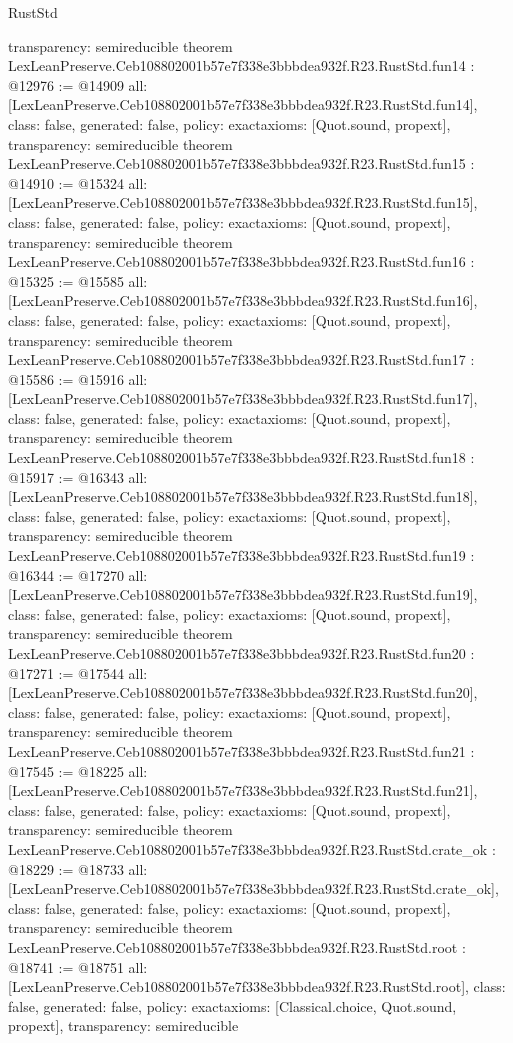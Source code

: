 \begin{lexlean}{RustStd}
\begin{coremodule}
{  transparency: semireducible
}
theorem LexLeanPreserve.Ceb108802001b57e7f338e3bbbdea932f.R23.RustStd.fun14 : @12976 := @14909 {
  all: [LexLeanPreserve.Ceb108802001b57e7f338e3bbbdea932f.R23.RustStd.fun14],
  class: false,
  generated: false,
  policy: exact{axioms: [Quot.sound, propext]},
  transparency: semireducible
}
theorem LexLeanPreserve.Ceb108802001b57e7f338e3bbbdea932f.R23.RustStd.fun15 : @14910 := @15324 {
  all: [LexLeanPreserve.Ceb108802001b57e7f338e3bbbdea932f.R23.RustStd.fun15],
  class: false,
  generated: false,
  policy: exact{axioms: [Quot.sound, propext]},
  transparency: semireducible
}
theorem LexLeanPreserve.Ceb108802001b57e7f338e3bbbdea932f.R23.RustStd.fun16 : @15325 := @15585 {
  all: [LexLeanPreserve.Ceb108802001b57e7f338e3bbbdea932f.R23.RustStd.fun16],
  class: false,
  generated: false,
  policy: exact{axioms: [Quot.sound, propext]},
  transparency: semireducible
}
theorem LexLeanPreserve.Ceb108802001b57e7f338e3bbbdea932f.R23.RustStd.fun17 : @15586 := @15916 {
  all: [LexLeanPreserve.Ceb108802001b57e7f338e3bbbdea932f.R23.RustStd.fun17],
  class: false,
  generated: false,
  policy: exact{axioms: [Quot.sound, propext]},
  transparency: semireducible
}
theorem LexLeanPreserve.Ceb108802001b57e7f338e3bbbdea932f.R23.RustStd.fun18 : @15917 := @16343 {
  all: [LexLeanPreserve.Ceb108802001b57e7f338e3bbbdea932f.R23.RustStd.fun18],
  class: false,
  generated: false,
  policy: exact{axioms: [Quot.sound, propext]},
  transparency: semireducible
}
theorem LexLeanPreserve.Ceb108802001b57e7f338e3bbbdea932f.R23.RustStd.fun19 : @16344 := @17270 {
  all: [LexLeanPreserve.Ceb108802001b57e7f338e3bbbdea932f.R23.RustStd.fun19],
  class: false,
  generated: false,
  policy: exact{axioms: [Quot.sound, propext]},
  transparency: semireducible
}
theorem LexLeanPreserve.Ceb108802001b57e7f338e3bbbdea932f.R23.RustStd.fun20 : @17271 := @17544 {
  all: [LexLeanPreserve.Ceb108802001b57e7f338e3bbbdea932f.R23.RustStd.fun20],
  class: false,
  generated: false,
  policy: exact{axioms: [Quot.sound, propext]},
  transparency: semireducible
}
theorem LexLeanPreserve.Ceb108802001b57e7f338e3bbbdea932f.R23.RustStd.fun21 : @17545 := @18225 {
  all: [LexLeanPreserve.Ceb108802001b57e7f338e3bbbdea932f.R23.RustStd.fun21],
  class: false,
  generated: false,
  policy: exact{axioms: [Quot.sound, propext]},
  transparency: semireducible
}
theorem LexLeanPreserve.Ceb108802001b57e7f338e3bbbdea932f.R23.RustStd.crate_ok : @18229 := @18733 {
  all: [LexLeanPreserve.Ceb108802001b57e7f338e3bbbdea932f.R23.RustStd.crate_ok],
  class: false,
  generated: false,
  policy: exact{axioms: [Quot.sound, propext]},
  transparency: semireducible
}
theorem LexLeanPreserve.Ceb108802001b57e7f338e3bbbdea932f.R23.RustStd.root : @18741 := @18751 {
  all: [LexLeanPreserve.Ceb108802001b57e7f338e3bbbdea932f.R23.RustStd.root],
  class: false,
  generated: false,
  policy: exact{axioms: [Classical.choice, Quot.sound, propext]},
  transparency: semireducible
}


\end{coremodule}
\end{lexlean}
